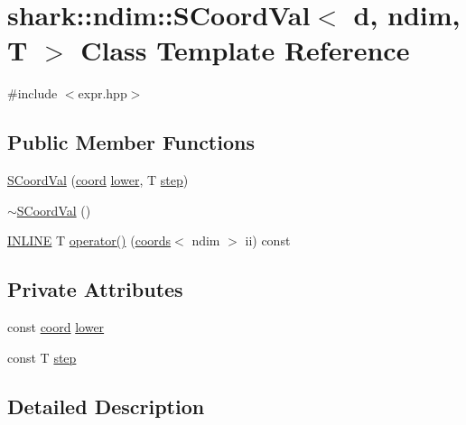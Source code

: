 \hypertarget{classshark_1_1ndim_1_1_s_coord_val}{}\section{shark\+:\+:ndim\+:\+:S\+Coord\+Val$<$ d, ndim, T $>$ Class Template Reference}
\label{classshark_1_1ndim_1_1_s_coord_val}


{\ttfamily \#include $<$expr.\+hpp$>$}

\subsection*{Public Member Functions}
\begin{DoxyCompactItemize}
\item 
\hyperlink{classshark_1_1ndim_1_1_s_coord_val_affad44c0ca1502ee2c63dd555a84a4ab}{S\+Coord\+Val} (\hyperlink{namespaceshark_a767a92d5dd82cb82266473bff42fa6d9}{coord} \hyperlink{classshark_1_1ndim_1_1_s_coord_val_a11ff11a433e0b0cfb8b5de96b3583eb2}{lower}, T \hyperlink{classshark_1_1ndim_1_1_s_coord_val_afd74ad2086b0e8c5bab9ee5906ec08fa}{step})
\item 
\hyperlink{classshark_1_1ndim_1_1_s_coord_val_aac1792753976c8339c7430550fd88bea}{$\sim$\+S\+Coord\+Val} ()
\item 
\hyperlink{common_8hpp_a2eb6f9e0395b47b8d5e3eeae4fe0c116}{I\+N\+L\+I\+NE} T \hyperlink{classshark_1_1ndim_1_1_s_coord_val_a6f32f75d306418cd9ac4392f058f1db6}{operator()} (\hyperlink{structshark_1_1ndim_1_1coords}{coords}$<$ ndim $>$ ii) const
\end{DoxyCompactItemize}
\subsection*{Private Attributes}
\begin{DoxyCompactItemize}
\item 
const \hyperlink{namespaceshark_a767a92d5dd82cb82266473bff42fa6d9}{coord} \hyperlink{classshark_1_1ndim_1_1_s_coord_val_a11ff11a433e0b0cfb8b5de96b3583eb2}{lower}
\item 
const T \hyperlink{classshark_1_1ndim_1_1_s_coord_val_afd74ad2086b0e8c5bab9ee5906ec08fa}{step}
\end{DoxyCompactItemize}


\subsection{Detailed Description}

